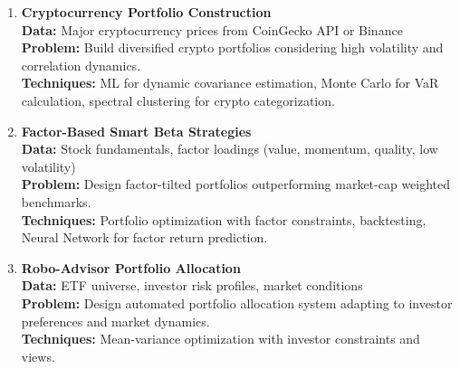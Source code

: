 \documentclass{article}
\begin{document}
\begin{enumerate}
\item \textbf{Cryptocurrency Portfolio Construction} \\
\textbf{Data:} Major cryptocurrency prices from CoinGecko API or Binance \\
\textbf{Problem:} Build diversified crypto portfolios considering high volatility and correlation dynamics. \\
\textbf{Techniques:} ML for dynamic covariance estimation, Monte Carlo for VaR calculation, spectral clustering for crypto categorization.

\item \textbf{Factor-Based Smart Beta Strategies} \\
\textbf{Data:} Stock fundamentals, factor loadings (value, momentum, quality, low volatility) \\
\textbf{Problem:} Design factor-tilted portfolios outperforming market-cap weighted benchmarks. \\
\textbf{Techniques:} Portfolio optimization with factor constraints, backtesting, Neural Network for factor return prediction.

\item \textbf{Robo-Advisor Portfolio Allocation} \\
\textbf{Data:} ETF universe, investor risk profiles, market conditions \\
\textbf{Problem:} Design automated portfolio allocation system adapting to investor preferences and market dynamics. \\
\textbf{Techniques:} Mean-variance optimization with investor constraints and views.

\end{enumerate}
\end{document}
